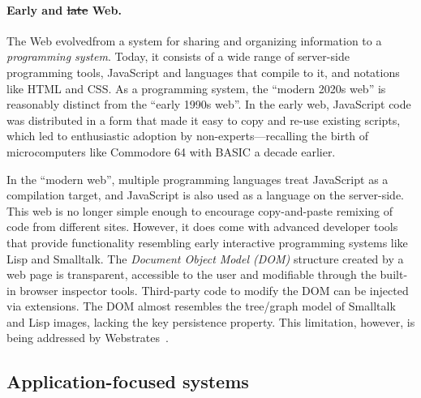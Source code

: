\documentclass[english,submission]{programming}
\providecommand{\DIFadd}[1]{{\protect\color{blue}\uwave{#1}}} %
\providecommand{\DIFdel}[1]{{\protect\color{red}\sout{#1}}}                      %
\providecommand{\DIFaddbegin}{} %
\providecommand{\DIFaddend}{} %
\providecommand{\DIFdelbegin}{} %
\providecommand{\DIFdelend}{} %
\begin{document}
\paragraph{Early and \DIFdelbegin \DIFdel{late }\DIFdelend \DIFaddbegin \DIFadd{modern }\DIFaddend Web.}

The Web evolved\DIFaddbegin \DIFadd{~\mbox{%
\cite{DotCom} }\hspace{0pt}%
}\DIFaddend from a system for sharing and organizing
information to a \emph{programming system}. Today, it consists of a wide
range of server-side programming tools, JavaScript and languages that
compile to it, and notations like HTML and CSS. As a programming system,
the ``modern 2020s web'' is reasonably distinct from the ``early 1990s
web''. In the early web, JavaScript code was distributed in a form that
made it easy to copy and re-use existing scripts, which led to
enthusiastic adoption by non-experts---recalling the birth of
microcomputers like Commodore 64 with BASIC a decade earlier.

In the ``modern web'', multiple programming languages treat JavaScript
as a compilation target, and JavaScript is also used as a language on
the server-side. This web is no longer simple enough to encourage
copy-and-paste remixing of code from different sites. However, it does
come with advanced developer tools that provide functionality resembling
early interactive programming systems like Lisp and Smalltalk. The
\emph{Document Object Model (DOM)} structure created by a web page is
transparent, accessible to the user and modifiable through the built-in
browser inspector tools. Third-party code to modify the DOM can be
injected via extensions. The DOM almost resembles the tree/graph model
of Smalltalk and Lisp images, lacking the key persistence property. This
limitation, however, is being addressed by Webstrates~\cite{Webstrates}.

\DIFdelbegin %
\DIFdelend \DIFaddbegin \hypertarget{application-focused-systems}{%
\subsection{Application-focused
systems}\label{application-focused-systems}}
\DIFaddend 
\end{document}
